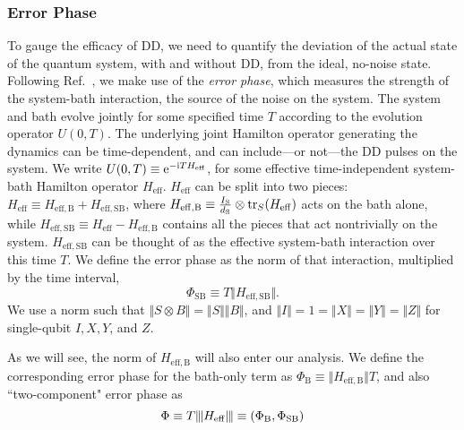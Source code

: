 \documentclass[pra,reprint,superscriptaddress]{revtex4-2}
\newcommand{\Heff}{H_\mathrm{eff}}
\newcommand{\HeffB}{H_\mathrm{eff,B}}
\newcommand{\HeffSB}{H_\mathrm{eff,SB}}
\newcommand{\ep}{\Phi_\mathrm{SB}}
\newcommand{\epB}{\Phi_\mathrm{B}}
\begin{document}
\subsubsection{Error Phase}
To gauge the efficacy of DD, we need to quantify the deviation of the actual state of the quantum system, with and without DD, from the ideal, no-noise state. Following Ref.~\cite{khodjasteh2007performance}, we make use of the \emph{error phase}, which measures the strength of the system-bath interaction, the source of the noise on the system. The system and bath evolve jointly for some specified time $T$ according to the evolution operator $U(0,T)$. The underlying joint Hamilton operator generating the dynamics can be time-dependent, and can include---or not---the DD pulses on the system. We write $U(0,T)\equiv \upe^{-\upi T\Heff}$, for some effective time-independent system-bath Hamilton operator $\Heff$. $\Heff$ can be split into two pieces: $\Heff\equiv \HeffB+\HeffSB$, where $\HeffB\equiv \frac{I_\mathrm{S}}{d_\mathrm{S}}\otimes\tr_S(\Heff)$ acts on the bath alone, while $\HeffSB\equiv \Heff-\HeffB$ contains all the pieces that act nontrivially on the system. $\HeffSB$ can be thought of as the effective system-bath interaction over this time $T$. We define the error phase as the norm of that interaction, multiplied by the time interval,
\begin{equation}\label{eq:ErrorPhase}
\ep\equiv T\Vert\HeffSB\Vert .
\end{equation}
We use a norm such that $\Vert S\otimes B\Vert = \Vert S\Vert \Vert B\Vert$, and $\Vert I\Vert =1=\Vert X\Vert = \Vert Y \Vert =\Vert Z\Vert$ for single-qubit $I, X, Y$, and $Z$.

As we will see, the norm of $\HeffB$ will also enter our analysis. We define the corresponding error phase for the bath-only term as $\epB\equiv \Vert\HeffB\Vert T$, and also ``two-component" error phase as
\begin{equation}
\Phi\equiv T\opnorm{\Heff}\equiv (\epB,\ep)
\end{equation}
\end{document}

